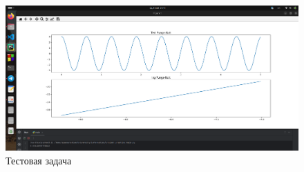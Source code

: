 \documentclass[a4paper,12pt]{article}
\begin{document}
	\begin{figure}[ht!]
		  \begin{center}
		  \includegraphics[scale=0.23]{sources/test.png}
		  \end{center}
		  \vspace*{-8mm}
		  \caption{Тестовая задача}\label{fig:test}
	\end{figure}
\end{document}
